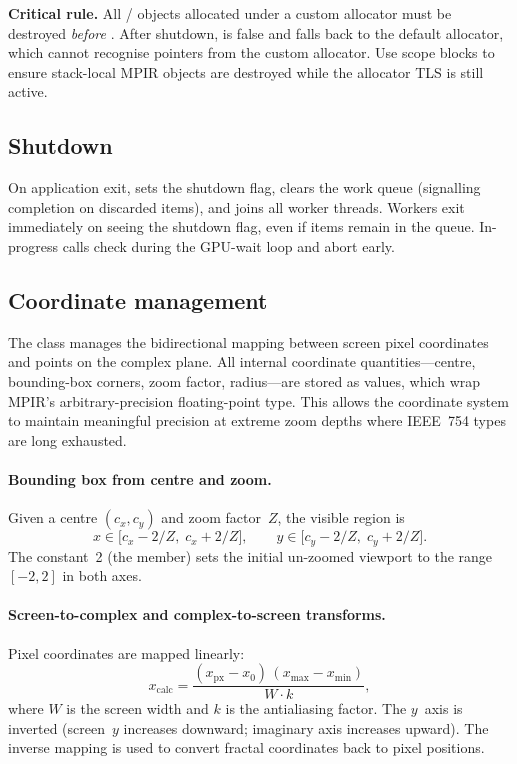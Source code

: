\textbf{Critical rule.}  All  /  objects
allocated under a custom allocator must be destroyed \emph{before}
.  After shutdown,  is false and
 falls back to the default allocator, which cannot recognise
pointers from the custom allocator.  Use \code{\{\,\}} scope blocks to ensure
stack-local MPIR objects are destroyed while the allocator TLS is still active.

\subsection{Shutdown}

On application exit,  sets the shutdown flag,
clears the work queue (signalling completion on discarded items), and joins all
worker threads.  Workers exit immediately on seeing the shutdown flag, even if
items remain in the queue.  In-progress  calls check
 during the GPU-wait loop and abort early.

\subsection{Coordinate management}
\label{subsec:coordinates}

The  class manages the bidirectional
mapping between screen pixel coordinates and points on the complex
plane.  All internal coordinate quantities---centre, bounding-box
corners, zoom factor, radius---are stored as 
values, which wrap MPIR's  arbitrary-precision
floating-point type.  This allows the coordinate system to maintain
meaningful precision at extreme zoom depths where IEEE~754 types are
long exhausted.

\paragraph{Bounding box from centre and zoom.}
Given a centre $(c_x, c_y)$ and zoom factor~$Z$, the visible region
is
\[
  x \in \bigl[c_x - 2/Z,\; c_x + 2/Z\bigr],\qquad
  y \in \bigl[c_y - 2/Z,\; c_y + 2/Z\bigr].
\]
The constant~2 (the  member) sets the initial
un-zoomed viewport to the range $[-2,2]$ in both axes.

\paragraph{Screen-to-complex and complex-to-screen transforms.}
Pixel coordinates are mapped linearly:
\[
  x_{\text{calc}} = \frac{(x_{\text{px}} - x_0)\,(x_{\max}-x_{\min})}
                         {W \cdot k},
\]
where $W$ is the screen width and $k$ is the antialiasing factor.
The $y$~axis is inverted (screen~$y$ increases downward; imaginary
axis increases upward).  The inverse mapping is used to convert
fractal coordinates back to pixel positions.

